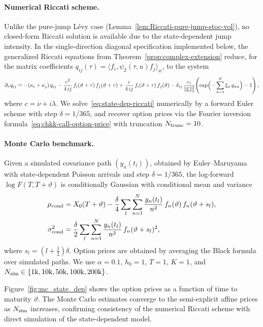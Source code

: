 \documentclass[10pt,a4paper,reqno]{amsart}
\numberwithin{equation}{section}
\theoremstyle{plain}
\theoremstyle{definition}
\theoremstyle{example}
\begin{document}
\paragraph{Numerical Riccati scheme.}
Unlike the pure-jump L\'evy case (Lemma~\ref{lem:Riccati-pure-jump-stoc-vol}), no closed-form Riccati solution is available due to the state-dependent jump intensity. In the single-direction diagonal specification implemented below, the generalized Riccati equations from Theorem~\ref{prop:complex-extension} reduce, for the matrix coefficients $q_{ij}(\tau) = \langle f_i, \psi_2(\tau,u)f_j\rangle_w$, to the system
\begin{equation}\label{eq:state-dep-riccati}
  \partial_\tau q_{ij}
  = -(\kappa_i+\kappa_j)\,q_{ij}
  - \frac{c^2}{4\,ij}\,f_i(\vartheta+\tau)\,f_j(\vartheta+\tau)
  + \frac{c}{4\,ij}\,f_i(\vartheta+\tau)\,f_j(\vartheta)
  - \delta_{ij}\,\frac{c_i}{\|\xi\|_2^2}\!\left(\exp\Bigl(-\sum_{n=1}^N \xi_n\, q_{nn}\Bigr)-1\right),
\end{equation}
where $c = \nu+i\lambda$. We solve~\eqref{eq:state-dep-riccati} numerically by a forward Euler scheme with step $\delta=1/365$, and recover option prices via the Fourier inversion formula~\eqref{eq:chkk-call-option-price} with truncation $N_{\rm trunc}=10$.

\paragraph{Monte Carlo benchmark.}
Given a simulated covariance path $(y_n(t_l))$, obtained by Euler--Maruyama with state-dependent Poisson arrivals and step $\delta=1/365$, the log-forward $\log F(T,T+\vartheta)$ is conditionally Gaussian with conditional mean and variance
\begin{align*}
  \mu_{\rm cond} &= X_0(T+\vartheta)
    - \frac{\delta}{4}\sum_{l}\sum_{n=1}^N \frac{y_n(t_l)}{n^2}\,f_n(\vartheta)\,f_n(\vartheta+s_l),\\
  \sigma_{\rm cond}^2 &= \frac{\delta}{2}\sum_{l}\sum_{n=1}^N \frac{y_n(t_l)}{n^2}\,f_n(\vartheta+s_l)^2,
\end{align*}
where $s_l=(l+\frac12)\delta$. Option prices are obtained by averaging the Black formula over simulated paths. We use $\alpha=0.1$, $h_0=1$, $T=1$, $K=1$, and $N_{\rm sim}\in\{1\mathrm{k},10\mathrm{k},50\mathrm{k},100\mathrm{k},200\mathrm{k}\}$.

Figure~\ref{fig:mc_state_dep} shows the option prices as a function of time to maturity $\vartheta$. The Monte Carlo estimates converge to the semi-explicit affine prices as $N_{\rm sim}$ increases, confirming consistency of the numerical Riccati scheme with direct simulation of the state-dependent model.
\end{document}
